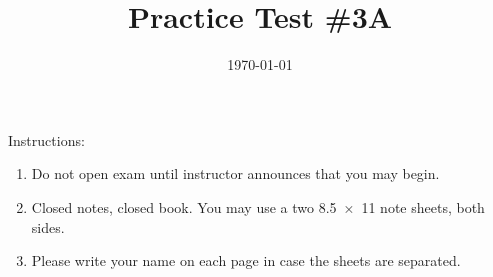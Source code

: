 \documentclass[exam,addpoints]{exam}
\title{Practice Test \#3A}
\date{\today}
\author{\mobeardInstructorShort}
\begin{document}
\maketitle
\vfill
\mobeardExamNameBlock
\vfill
Instructions: 
\begin{enumerate}
\item Do not open exam until instructor announces that you may begin.
\item Closed notes, closed book.  You may use a two \SI{8.5x11}{\inch} note sheets, both sides.
\item Please write your name on each page in case the sheets are separated. 
\end{enumerate}
\vfill
\begin{center}
\gradetable[h][questions]
\end{center}
\clearpage
\end{document}
